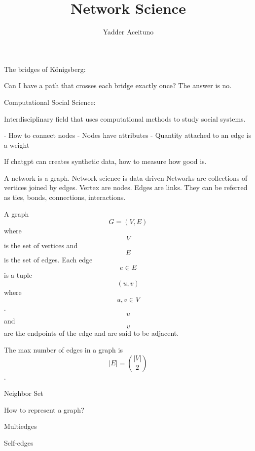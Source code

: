 \documentclass{article}
\title{Network Science}
\author{Yadder Aceituno}
\begin{document}
\maketitle

The bridges of Königsberg:

Can I have a path that crosses each bridge exactly once?
The answer is no.

Computational Social Science:

Interdisciplinary field that uses computational methods to study social systems.

- How to connect nodes
- Nodes have attributes
- Quantity attached to an edge is a weight

If chatgpt can creates synthetic data, how to measure how good is.

A network is a graph.
Network science is data driven
Networks are collections of vertices joined by edges.
Vertex are nodes.
Edges are links. They can be referred as ties, bonds, connections, interactions.

A graph $$ G = (V, E) $$ where $$ V $$ is the set of vertices and $$ E $$ is the set of edges.
Each edge $$ e \in E $$ is a tuple $$ (u, v) $$ where $$ u, v \in V $$.
$$ u $$ and $$ v $$ are the endpoints of the edge and are said to be adjacent.

The max number of edges in a graph is $$ |E| = \binom{|V|}{2} $$.

Neighbor Set

How to represent a graph?

Multiedges

Self-edges
\end{document}
